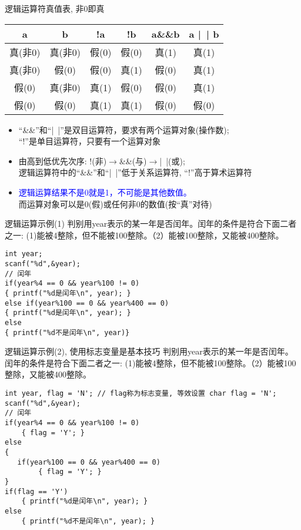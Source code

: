 \begin{frame}{逻辑运算符真值表, 非0即真}
\centering
\begin{tabular}{|c|c||c|c|c|c|}
\hline 
a       & b      & !a    & !b    & a\&\&b & a |~| b \\ 
\hline 
真(非0) & 真(非0) & 假(0) & 假(0) & 真(1)  & 真(1) \\ 
\hline
真(非0) & 假(0)   & 假(0) & 真(1) & 假(0)  & 真(1) \\ 
\hline 
假(0)   & 真(非0) & 真(1) & 假(0) & 假(0)  & 真(1) \\ 
\hline 
假(0)   & 假(0)   & 真(1) & 真(1) & 假(0)  & 假(0) \\ 
\hline  
\end{tabular} 
\begin{itemize}
	\item ``\&\&''和``|~|''是双目运算符，要求有两个运算对象(操作数);\\ ``!''是单目运算符，只要有一个运算对象
	\item 由高到低优先次序: !(非)$\to$\&\&(与)$\to$|~|(或);\\
          逻辑运算符中的``\&\&''和``|~|''低于关系运算符, ``!''高于算术运算符
	\item \textcolor{blue}{逻辑运算结果不是0就是1，不可能是其他数值。}\\
	      而运算对象可以是0(假)或任何非0的数值(按``真''对待)
\end{itemize}
\end{frame}

\begin{frame}{逻辑运算示例(1)}
判别用year表示的某一年是否闰年。闰年的条件是符合下面二者之一: (1)能被4整除，但不能被100整除。（2）能被100整除，又能被400整除。
\begin{lstlisting}
int year;
scanf("%d",&year);
// 闰年
if(year%4 == 0 && year%100 != 0)
{ printf("%d是闰年\n", year); }
else if(year%100 == 0 && year%400 == 0)
{ printf("%d是闰年\n", year); }
else
{ printf("%d不是闰年\n", year)}
\end{lstlisting}
\end{frame}

\begin{frame}{逻辑运算示例(2), 使用标志变量是基本技巧}
判别用year表示的某一年是否闰年。闰年的条件是符合下面二者之一: (1)能被4整除，但不能被100整除。（2）能被100整除，又能被400整除。
\begin{lstlisting}
int year, flag = 'N'; // flag称为标志变量, 等效设置 char flag = 'N'; 
scanf("%d",&year);
// 闰年
if(year%4 == 0 && year%100 != 0)
	{ flag = 'Y'; }
else
{ 
   if(year%100 == 0 && year%400 == 0)
   		{ flag = 'Y'; }
}
if(flag == 'Y') 
	{ printf("%d是闰年\n", year); }
else
	{ printf("%d不是闰年\n", year); }
\end{lstlisting}
\end{frame}

